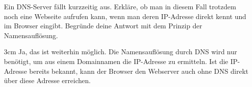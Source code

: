 \question[2]
Ein DNS-Server fällt kurzzeitig aus. Erkläre, ob man in diesem Fall 
trotzdem noch eine Webseite aufrufen kann, wenn man deren IP-Adresse direkt kennt 
und im Browser eingibt. Begründe deine Antwort mit dem Prinzip der Namensauflösung.

\begin{solutionbox}{3cm}
Ja, das ist weiterhin möglich. Die Namensauflösung durch DNS
wird nur benötigt, um aus einem Domainnamen die IP-Adresse zu
ermitteln. Ist die IP-Adresse bereits bekannt, kann der Browser
den Webserver auch ohne DNS direkt über diese Adresse
erreichen.
\end{solutionbox}
